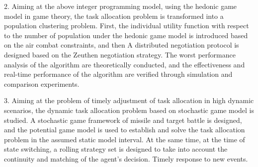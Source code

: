 \begin{abstract*}
  2. Aiming at the above integer programming model, using the hedonic game model in game theory, the task allocation problem is transformed into a population clustering problem. First, the individual utility function with respect to the number of population under the hedonic game model is introduced based on the air combat constraints, and then A distributed negotiation protocol is designed based on the Zeuthen negotiation strategy. The worst performance analysis of the algorithm are theoretically conducted, and the effectiveness and real-time performance of the algorithm are verified through simulation and comparison experiments.
  
  3. Aiming at the problem of timely adjustment of task allocation in high dynamic scenarios, the dynamic task allocation problem based on stochastic game model is studied. A stochastic game framework of missile and target battle is designed, and the potential game model is used to establish and solve the task allocation problem in the assumed static model interval. At the same time, at the time of state switching, a rolling strategy set is designed to take into account the continuity and matching of the agent’s decision. Timely response to new events.
\end{abstract*}
